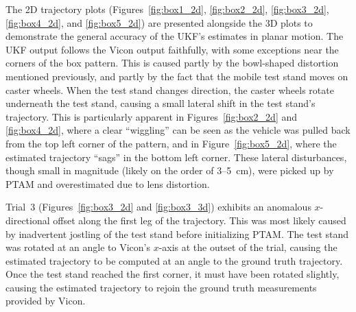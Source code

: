 The 2D trajectory plots (Figures~\ref{fig:box1_2d}, \ref{fig:box2_2d}, \ref{fig:box3_2d}, \ref{fig:box4_2d}, and \ref{fig:box5_2d}) are presented alongside the 3D plots to demonstrate the general accuracy of the UKF's estimates in planar motion. The UKF output follows the Vicon output faithfully, with some exceptions near the corners of the box pattern. This is caused partly by the bowl-shaped distortion mentioned previously, and partly by the fact that the mobile test stand moves on caster wheels. When the test stand changes direction, the caster wheels rotate underneath the test stand, causing a small lateral shift in the test stand's trajectory. This is particularly apparent in Figures~\ref{fig:box2_2d} and \ref{fig:box4_2d}, where a clear ``wiggling'' can be seen as the vehicle was pulled back from the top left corner of the pattern, and in Figure~\ref{fig:box5_2d}, where the estimated trajectory ``sags'' in the bottom left corner. These lateral disturbances, though small in magnitude (likely on the order of 3--5~cm), were picked up by PTAM and overestimated due to lens distortion.

Trial~3 (Figures~\ref{fig:box3_2d} and \ref{fig:box3_3d}) exhibits an anomalous $x$-directional offset along the first leg of the trajectory. This was most likely caused by inadvertent jostling of the test stand before initializing PTAM. The test stand was rotated at an angle to Vicon's $x$-axis at the outset of the trial, causing the estimated trajectory to be computed at an angle to the ground truth trajectory. Once the test stand reached the first corner, it must have been rotated slightly, causing the estimated trajectory to rejoin the ground truth measurements provided by Vicon.

\clearpage


